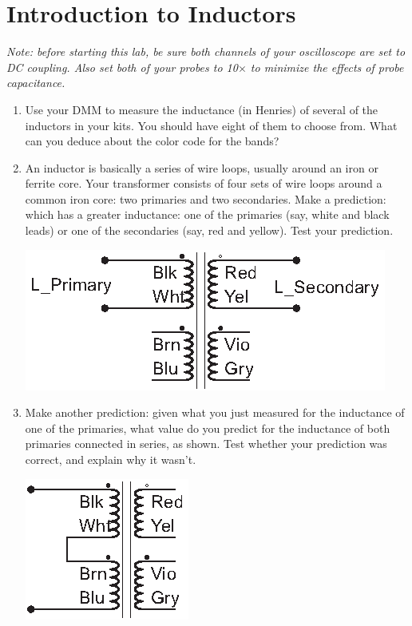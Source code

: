 \section{Introduction to Inductors}
\label{lab_inductors}


\bigskip

\textit{Note: before starting this lab, be sure both channels of your oscilloscope are set to DC coupling.  Also set both of your probes to 10$\times$ to minimize the effects of probe capacitance.}

\begin{enumerate}[wide]

\item Use your DMM to measure the inductance (in Henries) of several of the inductors in your kits.  You should have eight of them to choose from.  What can you deduce about the color code for the bands?

\item An inductor is basically a series of wire loops, usually around an iron or ferrite core.  Your transformer consists of four sets of wire loops around a common iron core: two primaries and two secondaries.  Make a prediction: which has a greater inductance: one of the primaries (say, white and black leads) or one of the secondaries (say, red and yellow).  Test your prediction.
\begin{center}
\includegraphics{inductors/transformer_as_inductor1.eps}
\end{center}

\item Make another prediction: given what you just measured for the inductance of one of the primaries, what value do you predict for the inductance of both primaries connected in series, as shown.  Test whether your prediction was correct, and explain why it wasn't. 
\begin{center}
\includegraphics{inductors/transformer_as_inductor2.eps}
\end{center}
 

\end{enumerate}
